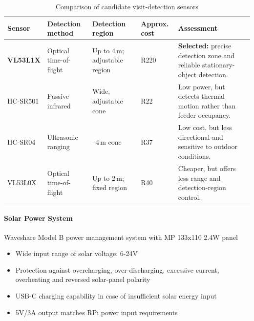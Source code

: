 \begin{table}[htbp]
    \centering
    \caption{Comparison of candidate visit-detection sensors}
    \label{tab:motion-sensor-comparison}
    \small
    \renewcommand{\arraystretch}{1.15}
    
    \begin{tabularx}{\textwidth}{
        >{\raggedright\arraybackslash}p{2.2cm}
        >{\raggedright\arraybackslash}p{2.2cm}
        >{\centering\arraybackslash}p{2.0cm}
        >{\centering\arraybackslash}p{1.8cm}
        >{\raggedright\arraybackslash}X}
        
        \toprule
        \textbf{Sensor} & \textbf{Detection method} &
        \textbf{Detection region} & \textbf{Approx. cost} &
        \textbf{Assessment} \\
        \midrule
        
        \rowcolor{green!12}
        \textbf{VL53L1X} &
        Optical time-of-flight &
        Up to 4\,m; adjustable region &
        R220 \cite{MantechVL53L1X} &
        \textbf{Selected:} precise detection zone and reliable stationary-object detection. \\
        
        HC-SR501 &
        Passive infrared &
        Wide, adjustable cone &
        R22 \cite{PiShopHCSR501} &
        Low power, but detects thermal motion rather than feeder occupancy. \\
        
        HC-SR04 &
        Ultrasonic ranging &
        0.02--4\,m cone &
        R37 \cite{DIYEHCSR04} &
        Low cost, but less directional and sensitive to outdoor conditions. \\
        
        VL53L0X &
        Optical time-of-flight &
        Up to 2\,m; fixed region &
        R40 \cite{PiShopVL53L0X} &
        Cheaper, but offers less range and detection-region control. \\
        
        \bottomrule
    \end{tabularx}
\end{table}

\paragraph{Solar Power System}
\par\vspace{6pt}
Waveshare Model B power management system with MP 133x110 2.4W panel
\begin{itemize}
    \item Wide input range of solar voltage: 6-24V
    \item Protection against overcharging, over-discharging, excessive current, overheating and reversed solar-panel polarity
    \item USB-C charging capability in case of insufficient solar energy input
    \item 5V/3A output matches RPi power input requirements
\end{itemize}


